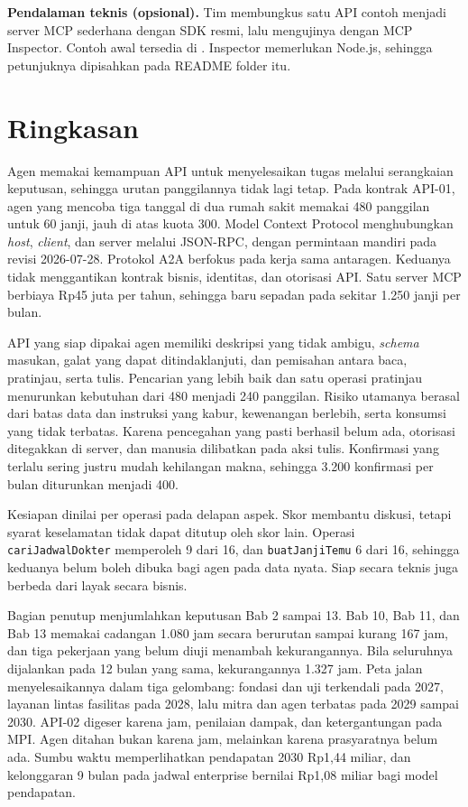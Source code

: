 \textbf{Pendalaman teknis (opsional).} Tim membungkus satu API contoh menjadi server MCP sederhana dengan SDK resmi, lalu mengujinya dengan MCP Inspector. Contoh awal tersedia di . Inspector memerlukan Node.js, sehingga petunjuknya dipisahkan pada README folder itu.

\section{Ringkasan}

Agen memakai kemampuan API untuk menyelesaikan tugas melalui serangkaian keputusan, sehingga urutan panggilannya tidak lagi tetap. Pada kontrak API-01, agen yang mencoba tiga tanggal di dua rumah sakit memakai 480 panggilan untuk 60 janji, jauh di atas kuota 300. Model Context Protocol menghubungkan \textit{host}, \textit{client}, dan server melalui JSON-RPC, dengan permintaan mandiri pada revisi 2026-07-28. Protokol A2A berfokus pada kerja sama antaragen. Keduanya tidak menggantikan kontrak bisnis, identitas, dan otorisasi API. Satu server MCP berbiaya Rp45 juta per tahun, sehingga baru sepadan pada sekitar 1.250 janji per bulan.

API yang siap dipakai agen memiliki deskripsi yang tidak ambigu, \textit{schema} masukan, galat yang dapat ditindaklanjuti, dan pemisahan antara baca, pratinjau, serta tulis. Pencarian yang lebih baik dan satu operasi pratinjau menurunkan kebutuhan dari 480 menjadi 240 panggilan. Risiko utamanya berasal dari batas data dan instruksi yang kabur, kewenangan berlebih, serta konsumsi yang tidak terbatas. Karena pencegahan yang pasti berhasil belum ada, otorisasi ditegakkan di server, dan manusia dilibatkan pada aksi tulis. Konfirmasi yang terlalu sering justru mudah kehilangan makna, sehingga 3.200 konfirmasi per bulan diturunkan menjadi 400.

Kesiapan dinilai per operasi pada delapan aspek. Skor membantu diskusi, tetapi syarat keselamatan tidak dapat ditutup oleh skor lain. Operasi \texttt{cariJadwalDokter} memperoleh 9 dari 16, dan \texttt{buatJanjiTemu} 6 dari 16, sehingga keduanya belum boleh dibuka bagi agen pada data nyata. Siap secara teknis juga berbeda dari layak secara bisnis.

Bagian penutup menjumlahkan keputusan Bab 2 sampai 13. Bab 10, Bab 11, dan Bab 13 memakai cadangan 1.080 jam secara berurutan sampai kurang 167 jam, dan tiga pekerjaan yang belum diuji menambah kekurangannya. Bila seluruhnya dijalankan pada 12 bulan yang sama, kekurangannya 1.327 jam. Peta jalan menyelesaikannya dalam tiga gelombang: fondasi dan uji terkendali pada 2027, layanan lintas fasilitas pada 2028, lalu mitra dan agen terbatas pada 2029 sampai 2030. API-02 digeser karena jam, penilaian dampak, dan ketergantungan pada MPI. Agen ditahan bukan karena jam, melainkan karena prasyaratnya belum ada. Sumbu waktu memperlihatkan pendapatan 2030 Rp1,44 miliar, dan kelonggaran 9 bulan pada jadwal enterprise bernilai Rp1,08 miliar bagi model pendapatan.

